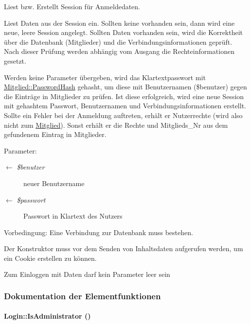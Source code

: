Liest bzw. Erstellt Session für Anmeldedaten. 

Liest Daten aus der Session ein. Sollten keine vorhanden sein, dann wird eine neue, leere Session angelegt. Sollten Daten vorhanden sein, wird die Korrektheit über die Datenbank (Mitglieder) und die Verbindungsinformationen geprüft. Nach dieser Prüfung werden abhängig vom Ausgang die Rechteinformationen gesetzt.\par
 Werden keine Parameter übergeben, wird das Klartextpasswort mit \hyperlink{classMitglied_9b13db80866c22bf992e73f2eb75e369}{Mitglied::Password\-Hash} gehasht, um diese mit Benutzernamen (\$benutzer) gegen die Einträge in Mitglieder zu prüfen. Ist diese erfolgreich, wird eine neue Session mit gehashtem Passwort, Benutzernamen und Verbindungsinformationen erstellt. Sollte ein Fehler bei der Anmeldung auftreten, erhält er Nutzerrechte (wird also nicht zum \hyperlink{classMitglied}{Mitglied}). Sonst erhält er die Rechte und Mitglieds\_\-Nr aus dem gefundenem Eintrag in Mitglieder. \begin{Desc}
\item[Parameter:]
\begin{description}
\item[\mbox{$\leftarrow$} {\em \$benutzer}]neuer Benutzername \item[\mbox{$\leftarrow$} {\em \$passwort}]Passwort in Klartext des Nutzers \end{description}
\end{Desc}
\begin{Desc}
\item[Vorbedingung:]Eine Verbindung zur Datenbank muss bestehen. 

Der Konstruktor muss vor dem Senden von Inhaltsdaten aufgerufen werden, um ein Cookie erstellen zu können. 

Zum Einloggen mit Daten darf kein Parameter leer sein \end{Desc}


\subsubsection{Dokumentation der Elementfunktionen}
\hypertarget{classLogin_6c120224aa6719f58c6ccd08acc28758}{
\paragraph[IsAdministrator]{\setlength{\rightskip}{0pt plus 5cm}Login::Is\-Administrator ()}\hfill}
\label{classLogin_6c120224aa6719f58c6ccd08acc28758}


